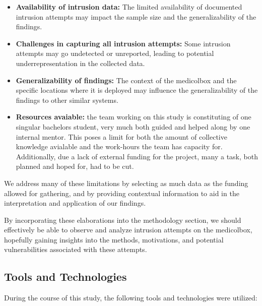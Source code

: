 \documentclass[../main.tex]{subfiles}
\begin{document}
    \begin{itemize}
        \item \textbf{Availability of \gls{intrusion} data:} The limited availability of documented \gls{intrusion} attempts may impact the sample size and the generalizability of the findings.

        \item \textbf{Challenges in capturing all \gls{intrusion} attempts:} Some \gls{intrusion} attempts may go undetected or unreported, leading to potential underrepresentation in the collected data.

        \item \textbf{Generalizability of findings:} The context of the \gls{medicolbox} and the specific locations where it is deployed may influence the generalizability of the findings to other similar systems.
        
        \item \textbf{Resources avaiable:} the team working on this study is constituting of one singular bachelors student, very much both guided and helped along by one internal mentor. This poses a limit for both the amount of collective knowledge avialable and the work-hours the team has capacity for. Additionally, due a lack of external funding for the project, many a task, both planned and hoped for, had to be cut.
    \end{itemize}
    
    We address many of these limitations by selecting as much data as the
    funding allowed for gathering, and by providing contextual information to
    aid in the interpretation and application of our findings.
    
    By incorporating these elaborations into the methodology section,
    we should effectively be able to observe and analyze \gls{intrusion}
    attempts on the \gls{medicolbox},
    hopefully gaining insights into the methods, motivations,
    and potential vulnerabilities associated with these attempts.
    
    \subsection{Tools and Technologies}

    During the course of this study, the following tools and technologies were utilized:
\end{document}
